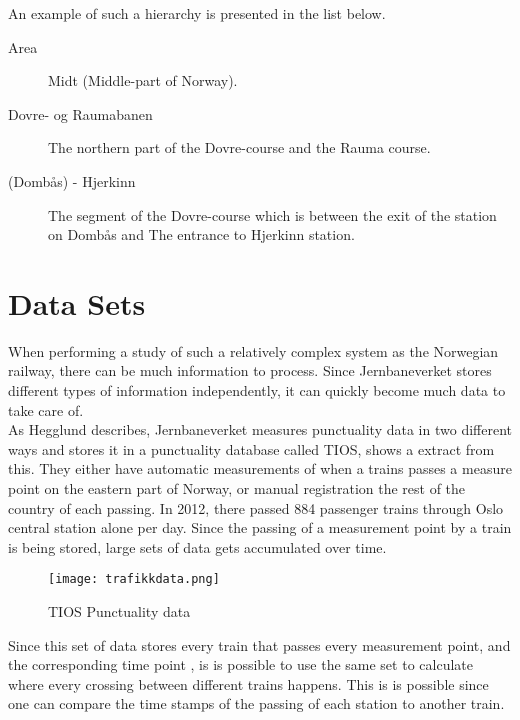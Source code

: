 \bigskip
An example of such a hierarchy is presented in the list below.

\begin{description}
	\item [Area] Midt (Middle-part of Norway).
	\item [Dovre- og Raumabanen] The northern part of the Dovre-course and the
	Rauma course.
	\item [(Dombås) - Hjerkinn] The segment of the Dovre-course which is 
	between the exit of the station on Dombås and The entrance to Hjerkinn
	station.
\end{description}


\clearpage
\section{Data Sets} %
\label{sec:back_data_sets}
When performing a study of such a relatively complex system as the
Norwegian railway, there can be much information to process. Since 
Jernbaneverket stores different types of information independently, it can 
quickly become much data to take care of.\\

As Hegglund\cite[pp. 10-11]{hegglundPunklighetsdataIJernbanetraffik} describes,
Jernbaneverket measures punctuality data in two different ways and stores it 
in a punctuality database called TIOS,  
shows a extract from this. They either have automatic measurements of when a 
trains passes a measure point on the eastern part of Norway, or manual 
registration the rest of the country of each passing. In 2012, there 
passed 884 passenger trains through Oslo central station alone per day\cite[p. 12]{jernbaneverketStatistikk}.
Since the passing of a measurement point by a train is being stored, large sets
of data gets accumulated over time.

\begin{figure}[!htbp]
	\texttt{[image: trafikkdata.png]}
	\caption[TIOS Punctuality data]{TIOS Punctuality data \cite{sintefPresis}}
	\label{fig:jernbaneverket-trafikkdata}
\end{figure}
\pagebreak

Since this set of data stores every train that passes every measurement point,
and the corresponding time point , is is possible
to use the same set to calculate where every crossing between different trains
happens. This is is possible since one can compare the time stamps of the
passing of each station to another train.\\

